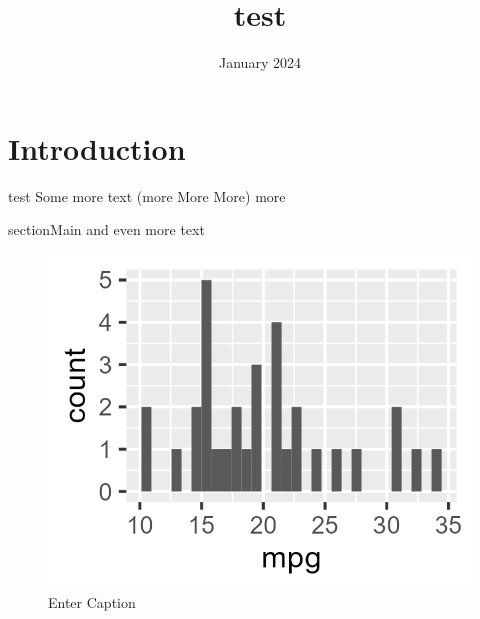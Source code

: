 \documentclass{article}
\title{test}
\author{ }
\date{January 2024}
\begin{document}
\maketitle

\section{Introduction}
test
Some more text (more More More)
more

section{Main}
and even more text

\begin{figure}
    \centering
    \includegraphics[width=0.5\linewidth]{images/mtcars-histogram.png}
    \caption{Enter Caption}
    \label{fig:enter-label}
\end{figure}
\end{document}
